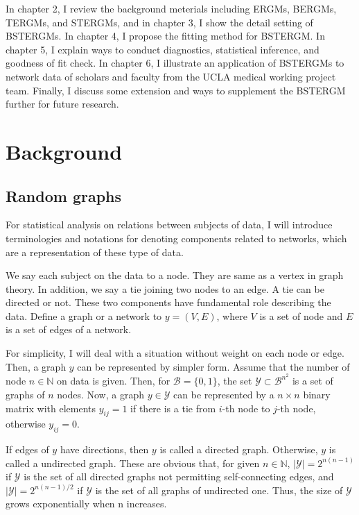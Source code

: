 \documentclass[aspectratio=169,ignorenonframetext,9pt]{beamer}
\theoremstyle{plain}
\theoremstyle{definition}
\begin{document}
In chapter 2, I review the background meterials including ERGMs, BERGMs, TERGMs, and STERGMs,
and in chapter 3, I show the detail setting of BSTERGMs. In chapter 4, I propose the fitting method for BSTERGM.
In chapter 5, I explain ways to conduct diagnostics, statistical inference, and goodness of fit check.
In chapter 6, I illustrate an application of BSTERGMs to network data of scholars and faculty
from the UCLA medical working project team. Finally, I discuss some extension and 
ways to supplement the BSTERGM further for future research.


\section{Background}
\subsection{Random graphs}
For statistical analysis on relations between subjects of data,
I will introduce terminologies and notations for denoting components related to networks, 
which are a representation of these type of data.

We say each subject on the data to a node. They are same as a vertex in graph theory.
In addition, we say a tie joining two nodes to an edge. A tie can be directed or not.
These two components have fundamental role describing the data.
Define a graph or a network to $y=(V,E)$, where $V$ is a set of node and $E$ is a set of edges of a network.

For simplicity, I will deal with a situation without weight on each node or edge.
Then, a graph $y$ can be represented by simpler form.
Assume that the number of node $n\in \mathbb{N}$ on data is given.
Then, for $\mathcal{B}=\{0,1\}$,
the set $\mathcal{Y} \subset \mathcal{B}^{n^2}$ is a set of graphs of $n$ nodes.
Now, a graph $y \in \mathcal{Y}$ can be represented by a $n \times n$ binary matrix
with elements $y_{ij}=1$ if there is a tie from $i$-th node to $j$-th node,
otherwise $y_{ij}=0$.

If edges of $y$ have directions, then $y$ is called a directed graph. Otherwise, $y$ is called a undirected graph.
These are obvious that, for given $n\in \mathbb{N}$,
$|\mathcal{Y}|=2^{n(n-1)}$ if $\mathcal{Y}$ is the set of all directed graphs not permitting self-connecting edges,
and $|\mathcal{Y}|=2^{n(n-1)/2}$ if $\mathcal{Y}$ is the set of all graphs of undirected one.
Thus, the size of $\mathcal{Y}$ grows exponentially when n increases.
\end{document}
